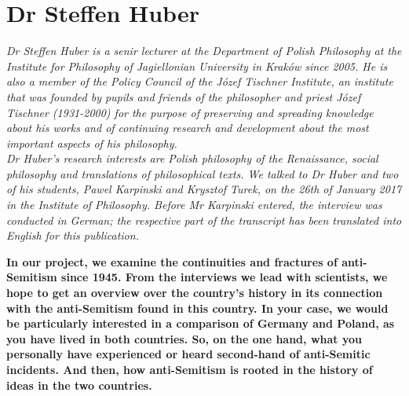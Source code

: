 \section{Dr Steffen Huber}

\textit{Dr Steffen Huber is a senir lecturer at the Department of Polish Philosophy at the Institute for Philosophy of Jagiellonian University in Kraków since 2005. He is also a member of the Policy Council of the Józef Tischner Institute, an institute that was founded by pupils and friends of the philosopher and priest Józef Tischner (1931-2000) for the purpose of preserving and spreading knowledge about his works and of continuing research and development about the most important aspects of his philosophy.\\ 
Dr Huber’s research interests are Polish philosophy of the Renaissance, social philosophy and translations of philosophical texts. We talked to Dr Huber and two of his students, Pawel Karpinski and Krysztof Turek, on the 26th of January 2017 in the Institute of Philosophy. Before Mr Karpinski entered, the interview was conducted in German; the respective part of the transcript has been translated into English for this publication.}\par
\vspace*{2em}
\textbf{In our project, we examine the continuities and fractures of anti-Semitism since 1945. From the interviews we lead with scientists, we hope to get an overview over the country's history in its connection with the anti-Semitism found in this country. In your case, we would be particularly interested in a comparison of Germany and Poland, as you have lived in both countries. So, on the one hand, what you personally have experienced or heard second-hand of anti-Semitic incidents. And then, how anti-Semitism is rooted in the history of ideas in the two countries.} 

